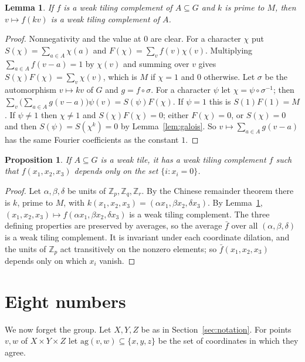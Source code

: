 \documentclass[11pt,a4paper]{amsart}
\newtheorem{proposition}[theorem]{Proposition}
\newtheorem{lemma}[theorem]{Lemma}
\theoremstyle{definition}
\theoremstyle{remark}
\newcommand{\Z}{\mathbb{Z}}
\begin{document}
\begin{lemma}\label{lem:dil}
If $f$ is a weak tiling complement of $A\subseteq G$ and $k$ is prime to $M$, then $v\mapsto f(kv)$ is a weak
tiling complement of $A$.
\end{lemma}
\begin{proof}
Nonnegativity and the value at $0$ are clear. For a character $\chi$ put $S(\chi)=\sum_{a\in A}\chi(a)$ and
$F(\chi)=\sum_v f(v)\chi(v)$. Multiplying $\sum_{a\in A}f(v-a)=1$ by $\chi(v)$ and summing over $v$ gives
$S(\chi)F(\chi)=\sum_v\chi(v)$, which is $M$ if $\chi=1$ and $0$ otherwise. Let $\sigma$ be the automorphism
$v\mapsto kv$ of $G$ and $g=f\circ\sigma$. For a character $\psi$ let $\chi=\psi\circ\sigma^{-1}$; then
$\sum_v\bigl(\sum_{a\in A}g(v-a)\bigr)\psi(v)=S(\psi)F(\chi)$. If $\psi=1$ this is $S(1)F(1)=M$. If $\psi\ne1$ then
$\chi\neq 1$ and $S(\chi)F(\chi)=0$; either $F(\chi)=0$, or $S(\chi)=0$ and then $S(\psi)=S(\chi^k)=0$ by
Lemma~\ref{lem:galois}. So $v\mapsto\sum_{a\in A}g(v-a)$ has the same Fourier coefficients as the constant $1$.
\end{proof}

\begin{proposition}\label{prop:step}
If $A\subseteq G$ is a weak tile, it has a weak tiling complement $f$ such that $f(x_1,x_2,x_3)$ depends only on
the set $\{i : x_i=0\}$.
\end{proposition}
\begin{proof}
Let $\alpha,\beta,\delta$ be units of $\Z_p,\Z_q,\Z_r$. By the Chinese remainder theorem there is $k$, prime to
$M$, with $k(x_1,x_2,x_3)=(\alpha x_1,\beta x_2,\delta x_3)$. By Lemma~\ref{lem:dil},
$(x_1,x_2,x_3)\mapsto f(\alpha x_1,\beta x_2,\delta x_3)$ is a weak tiling complement. The three defining
properties are preserved by averages, so the average $\bar f$ over all $(\alpha,\beta,\delta)$ is a weak tiling
complement. It is invariant under each coordinate dilation, and the units of $\Z_p$ act transitively on the
nonzero elements; so $\bar f(x_1,x_2,x_3)$ depends only on which $x_i$ vanish.
\end{proof}

\section{Eight numbers}\label{sec:eight}

We now forget the group. Let $X,Y,Z$ be as in Section~\ref{sec:notation}. For points $v,w$ of $X\times Y\times Z$
let $\mathrm{ag}(v,w)\subseteq\{x,y,z\}$ be the set of coordinates in which they agree.
\end{document}
